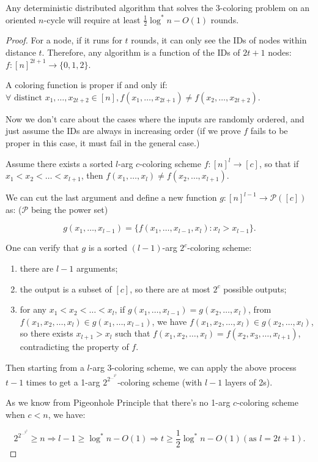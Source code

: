 \begin{theorem}
  Any deterministic distributed algorithm that solves the 3-coloring problem on an oriented $n$-cycle will require at least $\frac{1}{2}\log^* n - O(1)$ rounds.
\end{theorem}
\begin{proof}
  For a node, if it runs for $t$ rounds, it can only see the IDs of nodes within distance $t$. 
  Therefore, any algorithm is a function of the IDs of $2t+1$ nodes: $f: [n]^{2t+1} \to \{0,1,2\}$.

  A coloring function is proper if and only if: $\forall \text{ distinct } x_1, \ldots, x_{2t+2} \in [n], f(x_1, \ldots, x_{2t+1}) \neq f(x_2, \ldots, x_{2t+2})$.

  Now we don't care about the cases where the inputs are randomly ordered, and just assume the IDs are always in increasing order (if we prove $f$ fails to be proper in this case, it must fail in the general case.)

  Assume there exists a sorted $l$-arg $c$-coloring scheme $f: [n]^l \to [c]$, so that if $x_1 < x_2 < \ldots < x_{l+1}$, then $f(x_1, \ldots, x_l) \neq f(x_2, \ldots, x_{l+1})$.

  We can cut the last argument and define a new function $g: [n]^{l-1} \to \mathcal P([c])$ as: ($\mathcal P$ being the power set)

  \[
    g(x_1, \ldots, x_{l-1}) = \{f(x_1, \ldots, x_{l-1}, x_l) : x_l > x_{l-1}\}.
  \]

  One can verify that $g$ is a sorted $(l-1)$-arg $2^{c}$-coloring scheme: 

  \begin{enumerate}
    \item there are $l-1$ arguments; 
    \item the output is a subset of $[c]$, so there are at most $2^c$ possible outputs;
    \item for any $x_1 < x_2 < \ldots < x_l$, if $g(x_1, \ldots, x_{l-1}) = g(x_2, \ldots, x_l)$, from $f(x_1,x_2,\ldots,x_l) \in g(x_1,\ldots,x_{l-1})$, we have $f(x_1,x_2,\ldots,x_l) \in g(x_2,\ldots,x_l)$, so there exists $x_{l+1} > x_l$ such that $f(x_1,x_2,\ldots,x_l) = f(x_2,x_3,\ldots,x_{l+1})$, contradicting the property of $f$.
  \end{enumerate}

  Then starting from a $l$-arg 3-coloring scheme, we can apply the above process $t-1$ times to get a 1-arg $2^{2^{\ldots^{2^3}}}$-coloring scheme (with $l-1$ layers of 2s).

  As we know from Pigeonhole Principle that there's no 1-arg $c$-coloring scheme when $c < n$, we have:

  \[2^{2^{\ldots^{2^3}}} \geq n \Rightarrow l - 1 \geq \log^* n - O(1) \Rightarrow t \geq \frac{1}{2}\log^* n - O(1) (\text{as }l = 2t+1).
  \]
\end{proof}

